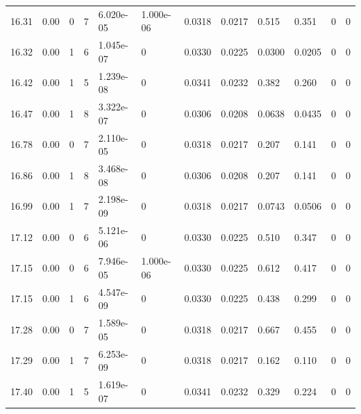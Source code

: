 \documentclass[preview]{standalone}
\begin{document}
{{{{{\begin{tabular}{L{1.2cm}C{1.2cm} C{0.3cm}C{0.5cm} C{1.4cm}C{1.4cm} C{1.4cm}C{1.4cm} C{1.6cm}C{1.6cm} C{1.6cm}C{1.6cm}}
  16.31  &  0.00  & 0     &  7 &  6.020e-05  & 1.000e-06  &  0.0318&   0.0217& 0.515 & 0.351   &  0 & 0  \\ 
  16.32  &  0.00  & 1     &  6 &  1.045e-07  & 0  &  0.0330&   0.0225& 0.0300 & 0.0205   &  0 & 0  \\ 
  16.42  &  0.00  & 1     &  5 &  1.239e-08  & 0  &  0.0341&   0.0232& 0.382 & 0.260   &  0 & 0  \\ 
  16.47  &  0.00  & 1     &  8 &  3.322e-07  & 0  &  0.0306&   0.0208& 0.0638 & 0.0435   &  0 & 0  \\ 
  16.78  &  0.00  & 0     &  7 &  2.110e-05  & 0  &  0.0318&   0.0217& 0.207 & 0.141   &  0 & 0  \\ 
  16.86  &  0.00  & 1     &  8 &  3.468e-08  & 0  &  0.0306&   0.0208& 0.207 & 0.141   &  0 & 0  \\ 
  16.99  &  0.00  & 1     &  7 &  2.198e-09  & 0  &  0.0318&   0.0217& 0.0743 & 0.0506   &  0 & 0  \\ 
  17.12  &  0.00  & 0     &  6 &  5.121e-06  & 0  &  0.0330&   0.0225& 0.510 & 0.347   &  0 & 0  \\ 
  17.15  &  0.00  & 0     &  6 &  7.946e-05  & 1.000e-06  &  0.0330&   0.0225& 0.612 & 0.417   &  0 & 0  \\ 
  17.15  &  0.00  & 1     &  6 &  4.547e-09  & 0  &  0.0330&   0.0225& 0.438 & 0.299   &  0 & 0  \\ 
  17.28  &  0.00  & 0     &  7 &  1.589e-05  & 0  &  0.0318&   0.0217& 0.667 & 0.455   &  0 & 0  \\ 
  17.29  &  0.00  & 1     &  7 &  6.253e-09  & 0  &  0.0318&   0.0217& 0.162 & 0.110   &  0 & 0  \\ 
  17.40  &  0.00  & 1     &  5 &  1.619e-07  & 0  &  0.0341&   0.0232& 0.329 & 0.224   &  0 & 0  \\ 
\hline 
\end{tabular} 

}}}}}
\end{document}
